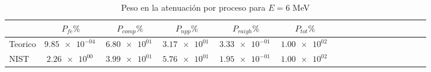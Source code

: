 \begin{table}
\caption{Peso en la atenuación por proceso para $E=6$ MeV}
\begin{tabular}{lcccccccccccccccc}
\toprule
 & $P_{fe} \%$ & $P_{comp} \%$  & $P_{npp} \%$  & $P_{raigh} \%$ & $P_{tot} \%$ \\
\midrule
Teorico & $\SI{9.85e-04}{}$ & $\SI{6.80e+01}{}$ & $\SI{3.17e+01}{}$ & $\SI{3.33e-01}{}$ & $\SI{1.00e+02}{}$ \\
NIST & $\SI{2.26e+00}{}$ & $\SI{3.99e+01}{}$ & $\SI{5.76e+01}{}$ & $\SI{1.95e-01}{}$ & $\SI{1.00e+02}{}$ \\
\bottomrule
\end{tabular}
\end{table}
